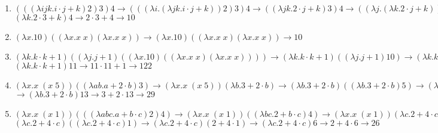 \documentclass[a4paper]{article}
\begin{document}
\begin{enumerate}
\begin{enumerate}
\item $(((\lambda ijk.i \cdot j+k)2)3)4 \rightarrow 
(((\lambda i.(\lambda jk.i \cdot j + k))2)3)4 \rightarrow
((\lambda jk.2 \cdot j + k)3)4 \rightarrow
((\lambda j.(\lambda k.2 \cdot j + k))3)4 \rightarrow$  \vspace*{3mm}\\
$ (\lambda k.2 \cdot 3 + k)4 \rightarrow 2 \cdot 3 + 4 \rightarrow 10 $
\vspace*{4mm}\\

\item $(\lambda x.10)((\lambda x. x \; x)(\lambda x. x \; x)) \rightarrow
(\lambda x.10)((\lambda x. x \; x)(\lambda x. x \; x)) \rightarrow 10$ 
\vspace*{4mm}\\

\item $(\lambda k.k \cdot k+1)((\lambda j.j+1)((\lambda x.10)((\lambda x. x \; x)(\lambda x. x \; x)))) \rightarrow (\lambda k.k \cdot k+1)((\lambda j.j+1)10)
\rightarrow (\lambda k.k \cdot k+1)(10+1) \rightarrow $\vspace*{3mm}\\
$(\lambda k.k \cdot k+1)11 \rightarrow 11 \cdot 11 + 1 \rightarrow 122$ 
\vspace*{4mm}\\

\item $(\lambda x.x \; (x \; 5))((\lambda ab.a+2\cdot b)3) \rightarrow
(\lambda x.x \; (x \; 5))(\lambda b.3+2\cdot b) \rightarrow
(\lambda b.3+2\cdot b)((\lambda b.3+2\cdot b)5) \rightarrow 
(\lambda b.3+2\cdot b)(3+2 \cdot 5)$ \vspace*{3mm}\\
$ \rightarrow (\lambda b.3+2\cdot b)13 \rightarrow 3 + 2 \cdot 13
\rightarrow 29$ \vspace*{4mm}\\

\item $(\lambda x.x \; (x \; 1))(((\lambda abc.a+b \cdot c)2)4) \rightarrow
(\lambda x.x \; (x \; 1))((\lambda bc.2+b \cdot c)4) \rightarrow
(\lambda x.x \; (x \; 1))(\lambda c.2+4 \cdot c) \rightarrow$ \vspace*{3mm} \\
$(\lambda c.2+4 \cdot c)((\lambda c.2+4 \cdot c)1) \rightarrow
(\lambda c.2+4 \cdot c)(2+4 \cdot 1) \rightarrow (\lambda c.2+4 \cdot c)6
\rightarrow 2 + 4 \cdot 6 \rightarrow 26$ \vspace*{4mm} \\
	

\end{enumerate}
\end{enumerate}
\end{document}
